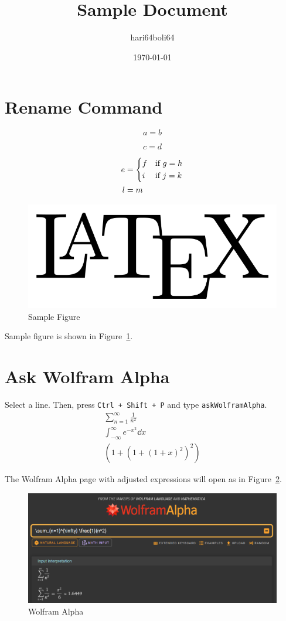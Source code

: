 \documentclass[a4paper, 10pt]{article}
\begin{document}
\title{Sample Document}
\author{hari64boli64}
\date{\today}
\maketitle

\section{Rename Command}

\begin{equation}\label{eq:1}
    a = b
\end{equation}

\begin{equation*}
    c = d
\end{equation*}

\begin{align}
    e & = \begin{dcases}
              f & \text{if } g = h \\
              i & \text{if } j = k
          \end{dcases} \\
    l & = m \notag
\end{align}

\begin{figure}[h] %
    \centering
    \includegraphics[width=0.5\columnwidth]{../images/sample.png}
    \caption{Sample Figure}
    \label{fig:1}
\end{figure}

Sample figure is shown in Figure~\ref{fig:1}.

\section{Ask Wolfram Alpha}

Select a line. Then, press \texttt{Ctrl + Shift + P} and type \texttt{askWolframAlpha}.
\begin{gather*}
    \sum_{n=1}^{\infty} \frac{1}{n^2} \\
    \int_{-\infty}^{\infty} e^{-x^2} \dd x \\
    \left(1+\left(1+\left(1+x\right)^2\right)^2\right)
\end{gather*}

The Wolfram Alpha page with adjusted expressions will open as in Figure~\ref{fig:2}.
\begin{figure}[htbp]
    \centering
    \includegraphics[width=\columnwidth]{../images/askWolframAlpha3.png}
    \caption{Wolfram Alpha}
    \label{fig:2}
\end{figure}
\end{document}
